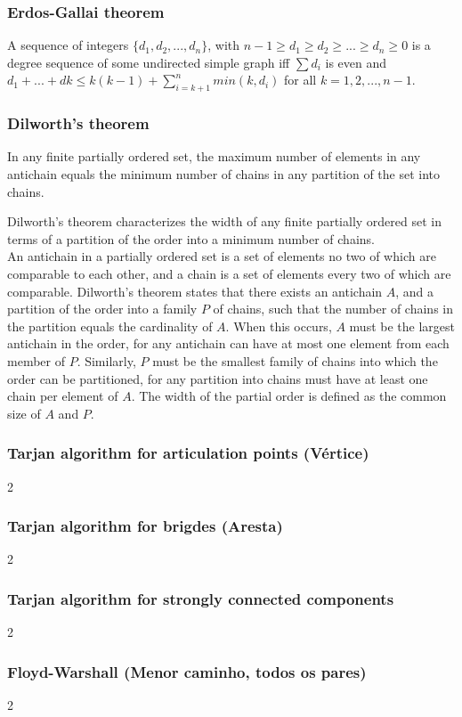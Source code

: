 \documentclass[a4paper,12pt]{article}
\newcommand\includefile[4]{
  \subsubsection{#2}
  \begin{multicols}{2}
    
  \end{multicols}
}
\begin{document}

\subsubsection{Erdos-Gallai theorem}
A sequence of integers $\{d_1,d_2,...,d_n\}$, with $n-1 \geq d_1 \geq d_2 \geq ... \geq d_n \geq 0$ is a degree sequence of some undirected simple graph iff $\sum d_i$ is even and $d_1+ ... + dk \leq k(k-1)+ \sum_{i=k+1}^{n}min(k, d_i)$
for all $k = 1, 2, . . . , n - 1$.

\subsubsection{Dilworth's theorem}
In any finite partially ordered set, the maximum number of elements in any antichain equals the minimum number of chains in any partition of the set into chains.

Dilworth's theorem characterizes the width of any finite partially ordered set in terms of a partition of the order into a minimum number of chains.\\
An antichain in a partially ordered set is a set of elements no two of which are comparable to each other, and a chain is a set of elements every two of which are comparable. Dilworth's theorem states that there exists an antichain $A$,
and a partition of the order into a family $P$ of chains, such that the number of chains in the partition equals the cardinality of $A$. When this occurs, $A$ must be the largest antichain in the order, for any antichain can have at most one
element from each member of $P$. Similarly, $P$ must be the smallest family of chains into which the order can be partitioned, for any partition into chains must have at least one chain per element of $A$. The width of the partial order is
defined as the common size of $A$ and $P$. 

\newpage
\includefile{c++}{Tarjan algorithm for articulation points (Vértice)}{graph}{tarjan_articulation.cpp}
\includefile{c++}{Tarjan algorithm for brigdes (Aresta)}{graph}{tarjan_bridges.cpp}

\newpage
\includefile{c++}{Tarjan algorithm for strongly connected components}{graph}{tarjan_scc.cpp}
\includefile{c++}{Floyd-Warshall (Menor caminho, todos os pares)}{graph}{floyd_warshall.cpp}
\end{document}
